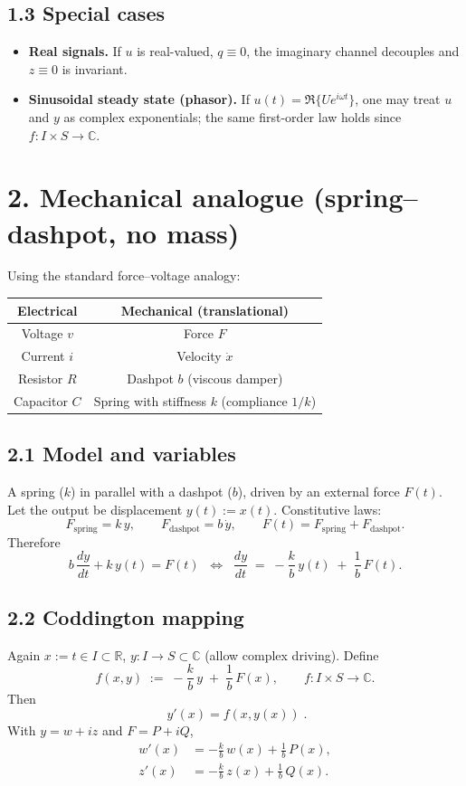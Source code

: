 \documentclass[12pt]{article}
\begin{document}
	\subsection*{1.3 Special cases}
	\begin{itemize}
		\item \textbf{Real signals.} If $u$ is real-valued, $q\equiv 0$, the imaginary channel decouples and $z\equiv 0$ is invariant.
		\item \textbf{Sinusoidal steady state (phasor).} If $u(t)=\Re\{U e^{i\omega t}\}$, one may treat $u$ and $y$ as complex exponentials; the same first-order law holds since $f: I\times S\to\mathbb{C}$.
	\end{itemize}
	
	\section*{2. Mechanical analogue (spring–dashpot, no mass)}
	
	Using the standard force–voltage analogy:
	\begin{center}
		\begin{tabular}{c|c}
			Electrical & Mechanical (translational)\\ \hline
			Voltage $v$ & Force $F$\\
			Current $i$ & Velocity $\dot{x}$\\
			Resistor $R$ & Dashpot $b$ (viscous damper)\\
			Capacitor $C$ & Spring with stiffness $k$ (compliance $1/k$)
		\end{tabular}
	\end{center}
	
	\subsection*{2.1 Model and variables}
	A spring ($k$) in parallel with a dashpot ($b$), driven by an external force $F(t)$. Let the output be displacement $y(t):=x(t)$. Constitutive laws:
	$$
	F_{\text{spring}}=k\,y, 
	\qquad
	F_{\text{dashpot}}=b\,\dot{y},
	\qquad
	F(t)=F_{\text{spring}}+F_{\text{dashpot}}.
	$$
	Therefore
	$$
	b\,\frac{dy}{dt}+k\,y(t)=F(t)
	\;\;\Longleftrightarrow\;\;
	\frac{dy}{dt} \;=\; -\frac{k}{b}\,y(t) \;+\; \frac{1}{b}\,F(t).
	$$
	
	\subsection*{2.2 Coddington mapping}
	Again $x:=t\in I\subset\mathbb{R}$, $y:I\to S\subset\mathbb{C}$ (allow complex driving). Define
	$$
	f(x,y)\;:=\; -\frac{k}{b}\,y \;+\; \frac{1}{b}\,F(x),
	\qquad
	f: I\times S \to \mathbb{C}.
	$$
	Then
	$$
	\boxed{\; y'(x)=f(x,y(x)) \;}.
	$$
	With $y=w+iz$ and $F=P+iQ$,
	$$
	\begin{aligned}
		w'(x) &= -\frac{k}{b}\,w(x) + \frac{1}{b}\,P(x),\\
		z'(x) &= -\frac{k}{b}\,z(x) + \frac{1}{b}\,Q(x).
	\end{aligned}
	$$
	
\end{document}
